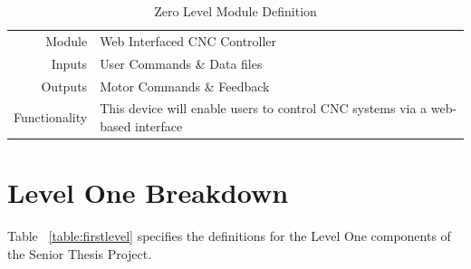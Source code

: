 \begin{table}[h] 
	\caption{Zero Level Module Definition}
	\label{table:zerolevel}
	\centering 
	\begin{tabular}{|r p{10cm}|} 
		\hline\hline
		Module		& Web Interfaced CNC Controller \\ 
		Inputs		& User Commands \& Data files 	\\ 
		Outputs		& Motor Commands \& Feedback	\\ 
		Functionality	& This device will enable users to control CNC systems via a web-based interface 	\\ 
		\hline
		\end{tabular} 
\end{table}

\section{Level One Breakdown}
Table ~\ref{table:firstlevel} specifies the definitions for the Level One components of the Senior Thesis Project. 
